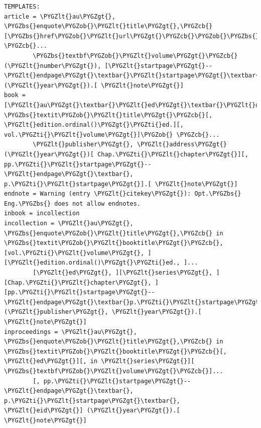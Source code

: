 \documentclass[letterpaper,10pt,english]{sphinxmanual}
\def\PYGZbs{\char`\\}
\def\PYGZob{\char`\{}
\def\PYGZcb{\char`\}}
\def\PYGZlt{\char`\<}
\def\PYGZgt{\char`\>}
\def\PYGZti{\char`\~}
\begin{document}
\begin{Verbatim}[commandchars=\\\{\}]
TEMPLATES:
article = \PYGZlt{}au\PYGZgt{}, \PYGZbs{}enquote\PYGZob{}\PYGZlt{}title\PYGZgt{},\PYGZcb{} [\PYGZbs{}href\PYGZob{}\PYGZlt{}url\PYGZgt{}\PYGZcb{}\PYGZob{}\PYGZbs{}textit\PYGZob{}\PYGZlt{}journal\PYGZgt{}\PYGZcb{}\PYGZcb{}\textbar{}\PYGZbs{}href\PYGZob{}\PYGZlt{}doi\PYGZgt{}\PYGZcb{}\PYGZob{}\PYGZbs{}textit\PYGZob{}\PYGZlt{}journal\PYGZgt{}\PYGZcb{}\PYGZcb{}\textbar{}\PYGZbs{}textit\PYGZob{}\PYGZlt{}journal\PYGZgt{}\PYGZcb{}]\PYGZob{} \PYGZcb{}...
        \PYGZbs{}textbf\PYGZob{}\PYGZlt{}volume\PYGZgt{}\PYGZcb{}(\PYGZlt{}number\PYGZgt{}), [\PYGZlt{}startpage\PYGZgt{}--\PYGZlt{}endpage\PYGZgt{}\textbar{}\PYGZlt{}startpage\PYGZgt{}\textbar{}\PYGZlt{}eid\PYGZgt{}\textbar{}] (\PYGZlt{}year\PYGZgt{}).[ \PYGZlt{}note\PYGZgt{}]
book = [\PYGZlt{}au\PYGZgt{}\textbar{}\PYGZlt{}ed\PYGZgt{}\textbar{}\PYGZlt{}organization\PYGZgt{}\textbar{}\PYGZlt{}institution\PYGZgt{}\textbar{}], \PYGZbs{}textit\PYGZob{}\PYGZlt{}title\PYGZgt{}\PYGZcb{}[, \PYGZlt{}edition.ordinal()\PYGZgt{}\PYGZti{}ed.][, vol.\PYGZti{}\PYGZlt{}volume\PYGZgt{}]\PYGZob{} \PYGZcb{}...
        \PYGZlt{}publisher\PYGZgt{}, \PYGZlt{}address\PYGZgt{} (\PYGZlt{}year\PYGZgt{})[ Chap.\PYGZti{}\PYGZlt{}chapter\PYGZgt{}][, pp.\PYGZti{}\PYGZlt{}startpage\PYGZgt{}--\PYGZlt{}endpage\PYGZgt{}\textbar{}, p.\PYGZti{}\PYGZlt{}startpage\PYGZgt{}].[ \PYGZlt{}note\PYGZgt{}]
endnote = Warning (entry \PYGZlt{}citekey\PYGZgt{}): Opt.\PYGZbs{} Eng.\PYGZbs{} does not allow endnotes.
inbook = incollection
incollection = \PYGZlt{}au\PYGZgt{}, \PYGZbs{}enquote\PYGZob{}\PYGZlt{}title\PYGZgt{},\PYGZcb{} in \PYGZbs{}textit\PYGZob{}\PYGZlt{}booktitle\PYGZgt{}\PYGZcb{}, [vol.\PYGZti{}\PYGZlt{}volume\PYGZgt{}, ][\PYGZlt{}edition.ordinal()\PYGZgt{}\PYGZti{}ed., ]...
        [\PYGZlt{}ed\PYGZgt{}, ][\PYGZlt{}series\PYGZgt{}, ][Chap.\PYGZti{}\PYGZlt{}chapter\PYGZgt{}, ][pp.\PYGZti{}\PYGZlt{}startpage\PYGZgt{}--\PYGZlt{}endpage\PYGZgt{}\textbar{}p.\PYGZti{}\PYGZlt{}startpage\PYGZgt{}\textbar{}\PYGZlt{}eid\PYGZgt{}\textbar{}] (\PYGZlt{}publisher\PYGZgt{}, \PYGZlt{}year\PYGZgt{}).[ \PYGZlt{}note\PYGZgt{}]
inproceedings = \PYGZlt{}au\PYGZgt{}, \PYGZbs{}enquote\PYGZob{}\PYGZlt{}title\PYGZgt{},\PYGZcb{} in \PYGZbs{}textit\PYGZob{}\PYGZlt{}booktitle\PYGZgt{}\PYGZcb{}[, \PYGZlt{}ed\PYGZgt{}][, in \PYGZlt{}series\PYGZgt{}][ \PYGZbs{}textbf\PYGZob{}\PYGZlt{}volume\PYGZgt{}\PYGZcb{}]...
        [, pp.\PYGZti{}\PYGZlt{}startpage\PYGZgt{}--\PYGZlt{}endpage\PYGZgt{}\textbar{}, p.\PYGZti{}\PYGZlt{}startpage\PYGZgt{}\textbar{}, \PYGZlt{}eid\PYGZgt{}] (\PYGZlt{}year\PYGZgt{}).[ \PYGZlt{}note\PYGZgt{}]

\end{Verbatim}
\end{document}
